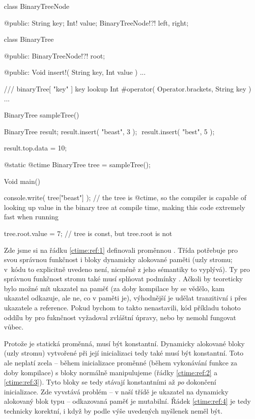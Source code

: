 \begin{code}
class BinaryTreeNode {
	
@public:
	String key;
	Int! value;
	BinaryTreeNode!?! left, right;
	
}
	
class BinaryTree {

@public:
	BinaryTreeNode!?! root;
	
@public:
	Void insert!( String key, Int value ) { ... }
	
	/// binaryTree[ "key" ] key lookup
	Int #operator( Operator.brackets, String key ) { ... }

}

BinaryTree sampleTree() {
	BinaryTree result;
	result.insert( "beast", 3 ); $\label{ctime:ref:2}$
	result.insert( "best", 5 ); $\label{ctime:ref:3}$
	
	result.top.data = 10;
}

@static @ctime BinaryTree tree = sampleTree(); $\label{ctime:ref:1}$

Void main() {
	console.write( tree["beast"] ); // the tree is @ctime, so the compiler is capable of looking up value in the binary tree at compile time, making this code extremely fast when running
	
	tree.root.value = 7; // tree is const, but tree.root is not $\label{ctime:ref:4}$
}
\end{code}

Zde jsme si na řádku \ref{ctime:ref:1} definovali \ctime proměnnou .  Třída  potřebuje pro svou správnou funkčnost i bloky dynamicky alokované paměti (uzly stromu; v~kódu to explicitně uvedeno není, nicméně z jeho sémantiky to vyplývá). Ty pro správnou funkčnost stromu také musí splňovat podmínky \ctime. Ačkoli by teoreticky bylo možné mít \ctime ukazatel na \nonctime paměť (za doby kompilace by se vědělo, kam ukazatel odkazuje, ale ne, co v paměti je), výhodnější je udělat \ctime tranzitivní i přes ukazatele a reference. Pokud bychom to takto nenastavili, kód příkladu tohoto oddílu by pro fuknčnost vyžadoval zvláštní úpravy, nebo by nemohl fungovat vůbec.

Protože  je statická \ctime proměnná, musí být konstantní. Dynamicky alokované bloky (uzly stromu) vytvořené při její inicializaci tedy také musí být konstantní. Toto ale neplatí zcela -- během inicializace proměnné  (během vykonávání funkce  za doby kompilace) s bloky normálně manipulujeme (řádky \ref{ctime:ref:2} a \ref{ctime:ref:3}). Tyto bloky se tedy stávají konstantními až \textit{po} dokončení inicializace. Zde vyvstává problém -- v naší třídě  je ukazatel na dynamicky alokovaný blok typu  -- odkazovaná paměť je mutabilní. Řádek \ref{ctime:ref:4} je tedy technicky korektní, i když by podle výše uvedených myšlenek neměl být.

